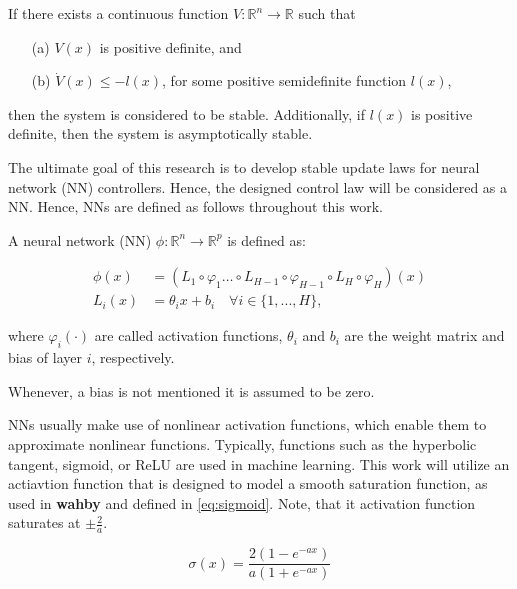 \begin{definition}
    If there exists a continuous function $V: \mathbb{R}^n \rightarrow \mathbb{R}$ such that
     \begin{enumerate}
       \item[(a)] $V(x)$ is positive definite, and
       \item[(b)] $\dot{V}(x)\leq-l(x)$, for some positive semidefinite function $l(x)$,
     \end{enumerate}
    then the system is considered to be stable. Additionally, if $l(x)$ is positive definite, then the system is asymptotically stable.
     \label{def:lyapunov-stability}
\end{definition}

The ultimate goal of this research is to develop stable update laws for neural network (NN) controllers. Hence, the designed control law will be considered as a NN. Hence, NNs are defined as follows throughout this work.

\begin{definition}
    A neural network (NN) $\phi:\mathbb{R}^n\rightarrow \mathbb{R}^p$ is defined as:
   
     \begin{equation}
      \begin{aligned}
        \phi (x) & = (L_1 \circ \varphi_1 \dots \circ L_{H-1} \circ \varphi_{H-1} \circ L_{H} \circ \varphi_H)(x)\\
        L_i(x) &= \theta_i x + b_i \quad \forall i\in\{1,..., H\},
      \end{aligned}
    \end{equation}
  
     where $\varphi_i(\cdot)$ are called  activation functions, $\theta_i$ and $b_i$ are the weight matrix and bias of layer $i$, respectively.
\end{definition}
Whenever, a bias is not mentioned it is assumed to be zero.

NNs usually make use of nonlinear activation functions, which enable them to approximate nonlinear functions. Typically, functions such as the hyperbolic tangent, sigmoid, or ReLU are used in machine learning. This work will utilize an actiavtion function that is designed to model a smooth saturation function, as used in \textbf{wahby}\cite{thanhNonlinearPIDControl2006} and defined in \eqref{eq:sigmoid}. Note, that it activation function saturates at $\pm \frac{2}{a}$.

\begin{equation}
    \sigma (x) = \frac{2(1-e^{-ax})}{a(1+e^{-ax})}
    \label{eq:sigmoid}
\end{equation}

